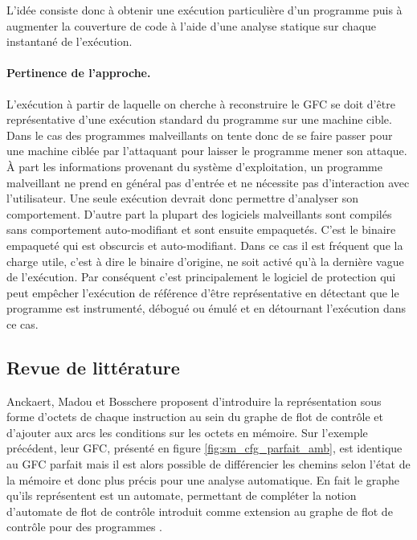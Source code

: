 L'idée consiste donc à obtenir une exécution particulière d'un programme puis à augmenter la couverture de code à l'aide d'une analyse statique sur chaque instantané de l'exécution.

\paragraph{Pertinence de l'approche.}
L'exécution à partir de laquelle on cherche à reconstruire le GFC se doit d'être représentative d'une exécution standard du programme sur une machine cible.
Dans le cas des programmes malveillants on tente donc de se faire passer pour une machine ciblée par l'attaquant pour laisser le programme mener son attaque. 
À part les informations provenant du système d'exploitation, un programme malveillant ne prend en général pas d'entrée et ne nécessite pas d'interaction avec l'utilisateur. Une seule exécution devrait donc permettre d'analyser son comportement.
D'autre part la plupart des logiciels malveillants sont compilés sans comportement auto-modifiant et sont ensuite empaquetés. C'est le binaire empaqueté qui est obscurcis et auto-modifiant.
Dans ce cas il est fréquent \cite{Calvet2013} que la charge utile, c'est à dire le binaire d'origine, ne soit activé qu'à la dernière vague de l'exécution.
Par conséquent c'est principalement le logiciel de protection qui peut empêcher l'exécution de référence d'être représentative en détectant que le programme est instrumenté, débogué ou émulé et en détournant l'exécution dans ce cas.


\FloatBarrier
\subsection{Revue de littérature}
Anckaert, Madou et Bosschere \cite{AMB06} proposent d'introduire la représentation sous forme d'octets de chaque instruction au sein du graphe de flot de contrôle et d'ajouter aux arcs les conditions sur les octets en mémoire. Sur l'exemple précédent, leur GFC, présenté en figure \ref{fig:sm_cfg_parfait_amb}, est identique au GFC parfait mais il est alors possible de différencier les chemins selon l'état de la mémoire et donc plus précis pour une analyse automatique.
En fait le graphe qu'ils représentent est un automate, permettant de compléter la notion d'automate de flot de contrôle introduit comme extension au graphe de flot de contrôle \cite{HJMS02} pour des programmes \sms.

